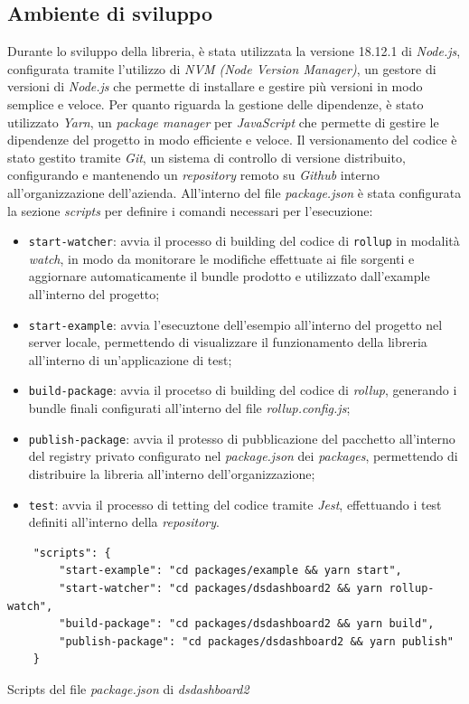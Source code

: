 \subsection{Ambiente di sviluppo}
Durante lo sviluppo della libreria, è stata utilizzata la versione 18.12.1 di \textit{Node.js}, configurata tramite l'utilizzo di \textit{NVM (Node Version Manager)},
un gestore di versioni di \textit{Node.js} che permette di installare e gestire più versioni in modo semplice e veloce. \newline
Per quanto riguarda la gestione delle dipendenze, è stato utilizzato \textit{Yarn}, un \textit{package manager} per \textit{JavaScript} che permette di gestire
le dipendenze del progetto in modo efficiente e veloce. \newline
Il versionamento del codice è stato gestito tramite \textit{Git}, un sistema di controllo di versione distribuito, configurando e
mantenendo un \textit{\gls{repository}\glox} remoto su \textit{Github} interno all'organizzazione dell'azienda. \newline
All'interno del file \textit{package.json} è stata configurata la sezione \textit{scripts} per definire i comandi necessari per l'esecuzione:
\begin{itemize}
    \item \texttt{start-watcher}: avvia il processo di building del codice di \texttt{rollup} in modalità \textit{watch}, in modo da monitorare le modifiche effettuate
          ai file sorgenti e aggiornare automaticamente il bundle prodotto e utilizzato dall'example all'interno del progetto;
    \item \texttt{start-example}: avvia l'esecuztone dell'esempio all'interno del progetto nel server locale, permettendo di visualizzare il funzionamento della libreria
          all'interno di un'applicazione di test;
    \item \texttt{build-package}: avvia il procetso di building del codice di \textit{rollup}, generando i bundle finali configurati all'interno del file \textit{rollup.config.js};
    \item \texttt{publish-package}: avvia il protesso di pubblicazione del pacchetto all'interno del registry privato configurato nel \textit{package.json} dei \textit{packages}, permettendo
          di distribuire la libreria all'interno dell'organizzazione;
    \item \texttt{test}: avvia il processo di tetting del codice tramite \textit{Jest}, effettuando i test definiti all'interno della \textit{repository}.
\end{itemize}
\begin{listing}[H]
    \begin{verbatim}
    "scripts": {
        "start-example": "cd packages/example && yarn start",
        "start-watcher": "cd packages/dsdashboard2 && yarn rollup-watch",
        "build-package": "cd packages/dsdashboard2 && yarn build",
        "publish-package": "cd packages/dsdashboard2 && yarn publish"
    }
    \end{verbatim}
    \caption{Scripts del file \textit{package.json} di \textit{dsdashboard2}}
    \label{listing:scripts_package_json_dsdashboard2}
\end{listing}

